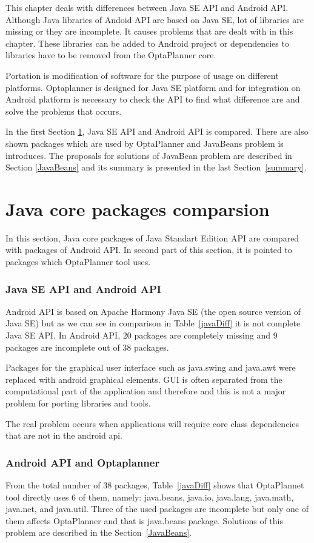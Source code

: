 This chapter deals with differences between Java SE API and Android API. Although Java libraries of Andoid API are based on Java SE, lot of libraries are missing or they are incomplete. It causes problems that are dealt with in this chapter. These libraries can be added to Android project or dependencies to libraries have to be removed from the OptaPlanner core.

Portation is modification of software for the purpose of usage on different platforms. Optaplanner is designed for Java SE platform and for integration on Android platform is necessary to check the API to find what difference are and solve the problems that occurs.

In the first Section \ref{comparsion}, Java SE API and Android API is compared. There are also shown packages which are used by OptaPlanner and JavaBeans problem is introduces. The proposals for solutions of JavaBean problem are described in Section \ref{JavaBeans} and its summary is presented in the last Section~\ref{summary}.

\section{Java core packages comparsion}\label{comparsion}
In this section, Java core packages of Java Standart Edition API are compared with packages of Android API. In second part of this section, it is pointed to packages which OptaPlanner tool uses.

\subsubsection{Java SE API and Android API}\label{apis}
Android API is based on Apache Harmony Java SE (the open source version of Java SE) but as we can see in comparison in Table~\ref{javaDiff} it is not complete Java SE API. In Android API, 20 packages are completely missing and 9 packages are incomplete out of 38 packages.

Packages for the graphical user interface such as java.swing and java.awt were replaced with android graphical elements. GUI is often separated from the computational part of the application and therefore and this is not a major problem for porting libraries and tools.

The real problem occurs when applications will require core class dependencies that are not in the android api.

\subsubsection{Android API and Optaplanner}
From the total number of 38 packages, Table~\ref{javaDiff} shows that OptaPlannet tool directly uses 6 of them, namely: java.beans, java.io, java.lang, java.math, java.net, and java.util. Three of the used packages are incomplete but only one of them affects OptaPlanner and that is java.beans package. Solutions of this problem are described in the Section~\ref{JavaBeans}.
